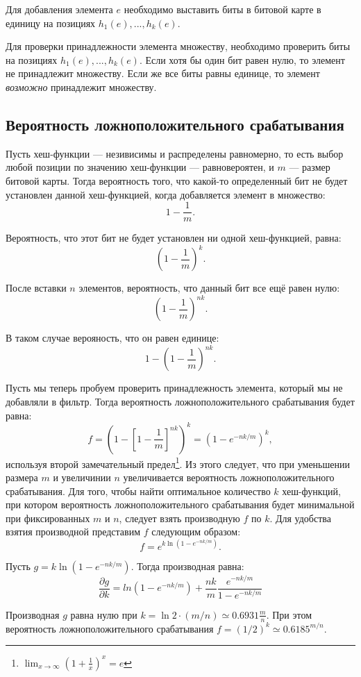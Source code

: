 Для добавления элемента $e$ необходимо выставить биты в битовой карте в единицу на позициях $h_1(e),...,h_k(e)$.

Для проверки принадлежности элемента множеству, необходимо проверить биты на позициях $h_1(e),...,h_k(e)$. Если хотя бы один бит равен нулю, то элемент не принадлежит множеству. Если же все биты равны единице, то элемент \emph{возможно} принадлежит множеству.

\subsection{Вероятность ложноположительного срабатывания}
Пусть хеш-функции — незивисимы и распределены равномерно, то есть выбор любой позиции по значению хеш-функции — равновероятен, и $m$ — размер битовой карты. Тогда вероятность того, что какой-то определенный бит не будет установлен данной хеш-функцией, когда добавляется элемент в множество:
\[
1 - \frac{1}{m}.
\]

Вероятность, что этот бит не будет установлен ни одной хеш-функцией, равна:
\[
\left( 1 - \frac{1}{m} \right)^k.
\]

После вставки $n$ элементов, вероятность, что данный бит все ещё равен нулю:
\[
\left( 1 - \frac{1}{m} \right)^{nk}.
\]

В таком случае верояность, что он равен единице:
\[
1 - \left( 1 - \frac{1}{m} \right)^{nk}.
\]

Пусть мы теперь пробуем проверить принадлежность элемента, который мы не добавляли в фильтр. Тогда вероятность ложноположительного срабатывания будет равна:
\[
f= \left( 1 - \left[ 1 - \frac{1}{m} \right]^{nk} \right)^k =  \left( 1 - e^{-nk / m} \right)^k,
\]
используя второй замечательный предел\footnote{$\lim_{x \to \infty} \left( 1 + \frac{1}{x} \right)^x = e$}. Из этого следует, что при уменьшении размера $m$ и увеличинии $n$ увеличивается вероятность ложноположительного срабатывания. Для того, чтобы найти оптимальное количество $k$ хеш-функций, при котором вероятность ложноположительного срабатывания будет минимальной при фиксированных $m$ и $n$, следует взять производную $f$ по $k$. Для удобства взятия производной представим $f$ следующим образом:
\[
f = e^{k\ln(1 - e^{-nk / m})}.
\]

Пусть $g = k\ln(1 - e^{-nk / m})$. Тогда производная равна:
\[
\frac{\partial g}{\partial k} = ln(1 - e^{-nk / m}) + \frac{nk}{m} \frac{e^{-nk / m}}{1 - e^{-nk / m}}
\]

Производная $g$ равна нулю при $k = \ln 2 \cdot (m / n) \simeq 0.6931 \frac{m}{n}$. При этом вероятность ложноположительного срабатывания $f = (1 / 2)^k \simeq 0.6185^{m / n}$.


